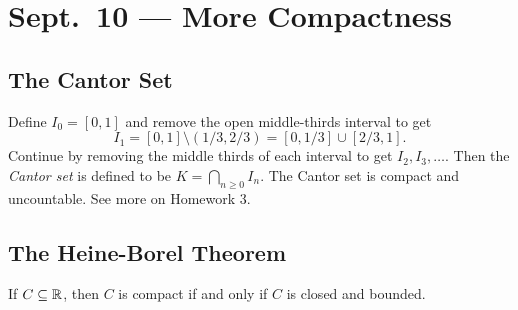 \chapter{Sept.~10 --- More Compactness}

\section{The Cantor Set}
Define $I_0 = [0, 1]$ and remove the open middle-thirds
interval to get
\[
  I_1 = [0, 1] \setminus (1 / 3, 2 / 3) = [0, 1 / 3] \cup [2 / 3, 1].
\]
Continue by removing the middle thirds of each interval
to get $I_2, I_3, \ldots$. Then the
\emph{Cantor set} is defined to be
$K = \bigcap_{n \ge 0} I_n$. The Cantor set is
compact and uncountable. See more on Homework 3.

\section{The Heine-Borel Theorem}
\begin{theorem}
  If $C \subseteq \mathbb{R}$, then $C$ is compact if
  and only if $C$ is closed and bounded.
\end{theorem}

